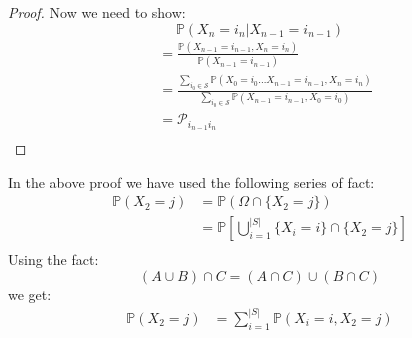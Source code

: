 \begin{proof}
    Now we need to show:
    \[
        \mathbb{P}(X_{n} = i_{n} | X_{n-1} = i_{n-1})
    \]
    \[
        \begin{aligned}
            & = \frac{\mathbb{P}(X_{n-1} = i_{n-1}, X_{n} = i_{n})}{\mathbb{P}(X_{n-1} = i_{n-1})} \\
            & = \frac{\sum_{i_0 \in \mathcal{S} } \mathbb{P}(X_0 = i_0 \dots  X_{n-1} = i_{n-1}, X_{n} = i_{n})}
            {\sum_{i_0 \in \mathcal{S} } \mathbb{P}(X_{n-1} = i_{n-1}, X_{0} = i_{0})} \\
            & = \mathcal{P} _{i_{n-1} i_n} \\
        \end{aligned}
    \]
\end{proof}\vspace{1em}
In the above proof we have used the following series of fact:
\[
    \begin{aligned}
        \mathbb{P} (X_2 = j) & = \mathbb{P}(\Omega \cap \{X_2 = j\})\\
        &= \mathbb{P} \left[ 
            \bigcup_{i=1}^{ |S| } \{X_i = i\} \cap \{X_2 = j\}
         \right] \\
    \end{aligned}
\]
Using the fact:
\[
    (A \cup B) \cap C = (A \cap C ) \cup (B \cap C)
\]
we get:
\[
    \begin{aligned}
        \mathbb{P} (X_2 = j) & = \sum\limits_{i = 1}^{ |S| } 
        \mathbb{P} \left(
             X_i = i, X_2 = j
         \right)
    \end{aligned}
\]

